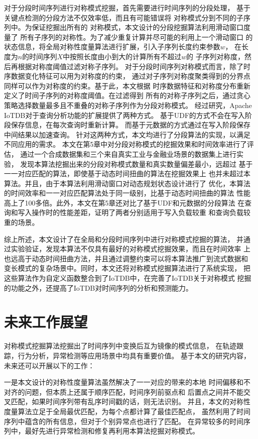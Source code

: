 对于分段时间序列进行对称模式挖掘，首先需要进行时间序列的分段处理，
基于关键点检测的分段方法不仅效率低，而且有可能错误将
对称模式分到不同的子序列中。为保证挖掘出所有的
对称模式，本文设计的分段挖掘算法利用滑动窗口度量了
所有子序列的对称性。为了减少重复计算并尽可能的利用上一个滑动窗口
的状态信息，将全局对称性度量算法进行扩展，引入子序列长度约束参数$w$，
在长度为$n$的时间序列$X$中按照长度由小到大的计算所有不超过$w$的
子序列对称度，然后再根据对称度阈值过滤对称子序列。
对于分段时间序列对称模式而言，除了时序数据变化特征可以用为对称度的约束，
通过对子序列对称度聚类得到的分界点同样可以作为对称度的约束。基于此，本文根据
时序数据特征和对称度分布重新定义了时间子序列的对称度阈值。在过滤得到
所有的对称子序列之后，通过贪心策略选择数量最多且不重叠的对称子序列作为分段对称模式。
经过研究，Apache IoTDB对于查询分析功能的扩展提供了两种方式。
基于UDF的方式不会在写入阶段保存信息，在每次查询时重新计算。
而基于元数据的方式通过在写入阶段保存中间结果以加速查询。
针对这两种方式，本文均进行了分段算法的实现，以满足不同应用的需求。
本文在第5章中对分段对称模式的挖掘效果和时间效率进行了评估，
通过一个合成数据集和三个来自真实工业与金融业场景的数据集上进行实验，
发现本算法挖掘出来的分段对称模式数量和真实数量偏差最小，远超过
基于一一对应匹配的算法，即使基于动态时间扭曲的算法在挖掘效果上
也并未超过本算法。并且，由于本算法利用滑动窗口对动态规划状态设计进行了
优化，本算法的时间效率和一一对应匹配算法处于同一级别，比基于动态时间扭曲的算法
性能高上了100多倍。此外，本文在第5章还对比了基于UDF和元数据的分段算法
在查询和写入操作时的性能差距，证明了两者分别适用于写入负载较重
和查询负载较重的场景。


综上所述，本文设计了在全局和分段时间序列中进行对称模式挖掘的算法，
并通过实验验证，发现本算法不仅具有最好的对称模式挖掘效果，而且在时间效率
上也远高于动态时间扭曲方法，并且通过调整约束可以将本算法推广到流式数据和
变长模式的复杂场景中。同时，本文还将对称模式挖掘算法进行了系统实现，
把这些算法作为自定义函数整合到了IoTDB中，在完善了IoTDB关于对称模式
挖掘的功能之外，还提高了IoTDB对时间序列的分析和预测能力。

\section{未来工作展望}
对称模式挖掘算法挖掘出了时间序列中变换后互为镜像的模式信息，
在轨迹跟踪，行为分析，异常检测等应用场景中均具有重要价值。
基于本文的研究内容，未来还可以开展以下的工作：

一是本文设计的对称性度量算法虽然解决了一一对应的带来的本地
时间偏移和不对齐的问题，但本质上还属于顺序匹配，时间序列前驱点和
后置点之间并不能交叉匹配，如果时间序列带有乱序时间戳的话，则无法识别。
并且，本文的对称性度量算法立足于全局最优匹配，为每个点都计算了最佳匹配点，
虽然利用了时间序列中蕴含的所有信息，但对于个别异常点也进行了匹配。
在异常较多的时间序列中，最好先进行异常检测和修复再利用本算法挖掘对称模式。

